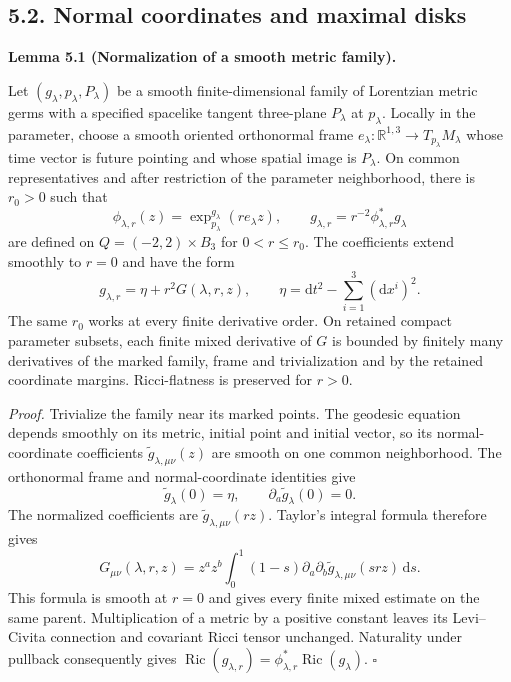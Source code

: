 \documentclass[
  english,
  11pt,
  reqno]{amsart}
\makeatletter
\newcommand{\paperdisplaynext}{%
  \let\paper@savedstartsection\@startsection
  \def\@startsection##1##2##3##4##5##6{%
    \let\@startsection\paper@savedstartsection
    \@tempskipa ##5\relax
    \ifdim\@tempskipa<\z@
      \def\paper@afterskip{.35\baselineskip}%
    \else
      \def\paper@afterskip{##5}%
    \fi
    \@startsection{##1}{##2}{##3}{##4}{\paper@afterskip}{##6}}}
\newcommand{\paperdisplaysection}{\paperdisplaynext\subsection}
\newcommand{\pandocstatementheading}[1]{%
  \par\if@nobreak\else
    \addpenalty{\@beginparpenalty}%
    \addvspace{.5\baselineskip plus .2\baselineskip minus .2\baselineskip}%
  \fi
  {\normalfont\bfseries #1\par}%
  \nobreak\@afterindenttrue\@afterheading
}
\let\paper@displaysection\paperdisplaysection
\renewcommand{\paperdisplaysection}[1]{%
  \let\paper@savedhangfrom\@hangfrom
  \long\def\@hangfrom##1##2{%
    \paper@savedhangfrom{##1}{\paper@headingparagraph##2}}%
  \paper@displaysection{#1}%
  \let\@hangfrom\paper@savedhangfrom}
\makeatother
\begin{document}
\paperdisplaysection{5.2. Normal coordinates and maximal
disks}\label{normal-coordinates-and-maximal-disks}\label{sec:submission-normalization}

\pandocstatementheading{\leavevmode{}\label{lem:submission-normal-coordinate-family}Lemma 5.1 (Normalization of a smooth metric family).}

Let \((g_\lambda,p_\lambda,P_\lambda)\) be a smooth finite-dimensional
family of Lorentzian metric germs with a specified spacelike tangent
three-plane \(P_\lambda\) at \(p_\lambda\). Locally in the parameter,
choose a smooth oriented orthonormal frame
\(e_\lambda:\mathbb R^{1,3}\to T_{p_\lambda}M_\lambda\) whose time
vector is future pointing and whose spatial image is \(P_\lambda\). On
common representatives and after restriction of the parameter
neighborhood, there is \(r_0>0\) such that%
 \[
\phi_{\lambda,r}(z)
=
\exp^{g_\lambda}_{p_\lambda}(r e_\lambda z),
\qquad
g_{\lambda,r}
=
r^{-2}\phi_{\lambda,r}^*g_\lambda
\] are defined on \(Q=(-2,2)\times B_3\) for \(0<r\le r_0\). The
coefficients extend smoothly to \(r=0\) and have the form%
 \[
g_{\lambda,r}
=
\eta+r^2G(\lambda,r,z),
\qquad
\eta=\mathrm dt^2-\sum_{i=1}^3(\mathrm dx^i)^2.
\] The same \(r_0\) works at every finite derivative order. On retained
compact parameter subsets, each finite mixed derivative of \(G\) is
bounded by finitely many derivatives of the marked family, frame and
trivialization and by the retained coordinate margins. Ricci-flatness is
preserved for \(r>0\).

\emph{Proof.} Trivialize the family near its marked points. The geodesic
equation depends smoothly on its metric, initial point and initial
vector, so its normal-coordinate coefficients
\(\widetilde g_{\lambda,\mu\nu}(z)\) are smooth on one common
neighborhood. The orthonormal frame and normal-coordinate identities
give \[
\widetilde g_\lambda(0)=\eta,
\qquad
\partial_a\widetilde g_\lambda(0)=0.
\] The normalized coefficients are
\(\widetilde g_{\lambda,\mu\nu}(rz)\). Taylor's integral formula
therefore gives%
 \[
G_{\mu\nu}(\lambda,r,z)
=
z^az^b\int_0^1(1-s)
\partial_a\partial_b\widetilde g_{\lambda,\mu\nu}(srz)\,\mathrm ds.
\] This formula is smooth at \(r=0\) and gives every finite mixed
estimate on the same parent. Multiplication of a metric by a positive
constant leaves its Levi--Civita connection and covariant Ricci tensor
unchanged. Naturality under pullback consequently gives
\(\operatorname{Ric}(g_{\lambda,r})=\phi_{\lambda,r}^*\operatorname{Ric}(g_\lambda)\).
\hfill\(\square\)
\end{document}
